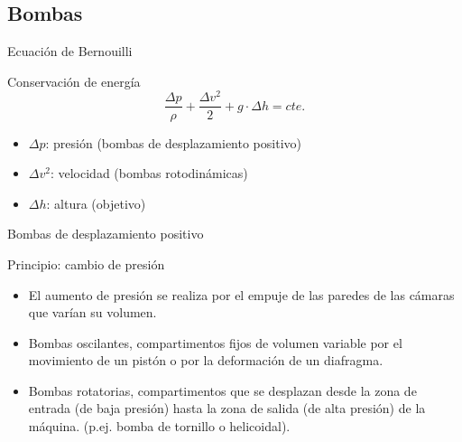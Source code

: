 \documentclass[xcolor={usenames,svgnames,dvipsnames}]{beamer}
\begin{document}
\subsection{Bombas}
\label{sec:orge99c95c}

\begin{frame}[label={sec:org5df48e8}]{Ecuación de Bernouilli}
\begin{block}{Conservación de energía}
$$\frac{\Delta p}{\rho}+\frac{\Delta v^2}{2}+g\cdot\Delta h=cte.$$
\begin{itemize}
\item \(\Delta p\): presión (bombas de desplazamiento positivo)
\item \(\Delta v^2\): velocidad (bombas rotodinámicas)
\item \(\Delta h\): altura (objetivo)
\end{itemize}
\end{block}
\end{frame}


\begin{frame}[label={sec:org153d4b6}]{Bombas de desplazamiento positivo}
\begin{block}{\alert{Principio}: cambio de presión}
\begin{itemize}
\item El aumento de presión se realiza por el empuje de las paredes de las cámaras que varían su volumen.

\item \alert{Bombas oscilantes}, compartimentos fijos de volumen variable por el movimiento de un pistón o por la deformación de un diafragma.

\item \alert{Bombas rotatorias}, compartimentos que se desplazan desde la zona de entrada (de baja presión) hasta la zona de salida (de alta presión) de la máquina. (p.ej. bomba de tornillo o helicoidal).
\end{itemize}
\end{block}
\end{frame}
\end{document}
